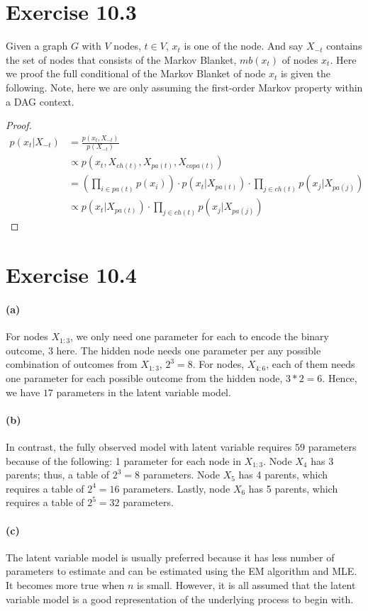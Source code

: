 \documentclass[11pt, letterpaper]{article}
\begin{document}
\section{Exercise 10.3}
Given a graph $G$ with $V$ nodes, $t \in V$, $x_t$ is one of the node. And say $X_{-t}$ contains the set of nodes that consists of the Markov Blanket, $mb(x_t)$ of nodes $x_t$. Here we proof the full conditional of the Markov Blanket of node $x_t$ is given the following. Note, here we are only assuming the first-order Markov property within a DAG context.
\begin{proof}
\begin{align*}
    p(x_t|X_{-t}) &= \frac{p(x_t, X_{-t})}{p(X_{-t})} \\
        &\propto p(x_t, X_{ch(t)}, X_{pa(t)}, X_{copa(t)}) \\
        &= (\prod_{i \in pa(t)} p(x_i)) \cdot p(x_t|X_{pa(t)}) \cdot \prod_{j \in ch(t)} p(x_j|X_{pa(j)}) \\
        &\propto p(x_t|X_{pa(t)}) \cdot \prod_{j \in ch(t)} p(x_j|X_{pa(j)})
\end{align*}
\end{proof}

\section{Exercise 10.4}
\paragraph{(a)}
For nodes $X_{1:3}$, we only need one parameter for each to encode the binary outcome, 3 here. The hidden node needs one parameter per any possible combination of outcomes from $X_{1:3}$, $2^3=8$. For nodes, $X_{4:6}$, each of them needs one parameter for each possible outcome from the hidden node, $3*2=6$. Hence, we have $17$ parameters in the latent variable model.

\paragraph{(b)}
In contrast, the fully observed model with latent variable requires $59$ parameters because of the following: 1 parameter for each node in $X_{1:3}$. Node $X_4$ has 3 parents; thus, a table of $2^3=8$ parameters. Node $X_5$ has 4 parents, which requires a table of $2^4=16$ parameters. Lastly, node $X_6$ has 5 parents, which requires a table of $2^5=32$ parameters.

\paragraph{(c)}
The latent variable model is usually preferred because it has less number of parameters to estimate and can be estimated using the EM algorithm and MLE. It becomes more true when $n$ is small. However, it is all assumed that the latent variable model is a good representation of the underlying process to begin with.
\end{document}

